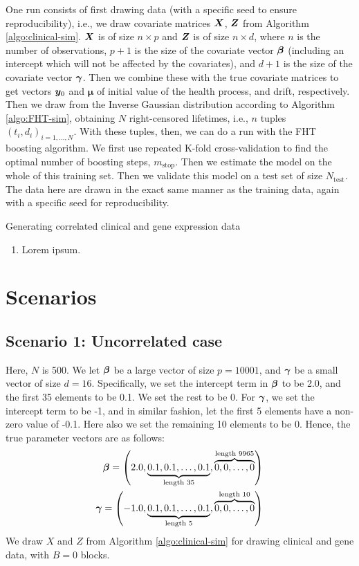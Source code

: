 One run consists of first drawing data (with a specific seed to ensure reproducibility), i.e., we draw covariate matrices $\bm{X}$, $\bm{Z}$ from Algorithm \ref{algo:clinical-sim}.
$\bm{X}$ is of size $n\times p$ and $\bm{Z}$ is of size $n\times d$, where $n$ is the number of observations, $p+1$ is the size of the covariate vector $\boldsymbol{\beta}$ (including an intercept which will not be affected by the covariates), and $d+1$ is the size of the covariate vector $\boldsymbol{\gamma}$.
Then we combine these with the true covariate matrices to get vectors $\bm{y}_0$ and $\mathbf{\mu}$ of initial value of the health process, and drift, respectively.
Then we draw from the Inverse Gaussian distribution according to Algorithm \ref{algo:FHT-sim}, obtaining $N$ right-censored lifetimes, i.e., $n$ tuples $(t_i,d_i)_{i=1,\ldots,N}$.
With these tuples, then, we can do a run with the FHT boosting algorithm. We first use repeated K-fold cross-validation to find the optimal number of boosting steps, $m_{\text{stop}}$.
Then we estimate the model on the whole of this training set.
Then we validate this model on a test set of size $N_{\text{test}}$.
The data here are drawn in the exact same manner as the training data, again with a specific seed for reproducibility.

\begin{algorithm}
\caption{Generating correlated clinical and gene expression data}
\label{algo:clinical-sim}
\begin{enumerate}
    \item Lorem ipsum.
\end{enumerate}
\end{algorithm}

\section{Scenarios}
\subsection{Scenario 1: Uncorrelated case}

Here, $N$ is 500. We let $\boldsymbol{\beta}$ be a large vector of size $p=10001$, and $\boldsymbol{\gamma}$ be a small vector of size $d=16$. Specifically, we set the intercept term in $\boldsymbol{\beta}$ to be 2.0, and the first 35 elements to be 0.1. We set the rest to be 0. For $\boldsymbol{\gamma}$, we set the intercept term to be -1, and in similar fashion, let the first 5 elements have a non-zero value of -0.1. Here also we set the remaining 10 elements to be 0.
Hence, the true parameter vectors are as follows:
\begin{align*}
    \boldsymbol{\beta}=\left(2.0, \underbrace{0.1, 0.1, \ldots, 0.1}_{\text{length 35}}, \overbrace{0, 0, \ldots, 0}^{\text{length 9965}}\right) \\
    \boldsymbol{\gamma}=\left(-1.0, \underbrace{0.1, 0.1, \ldots, 0.1}_{\text{length 5}}, \overbrace{0, 0, \ldots, 0}^{\text{length 10}}\right)
\end{align*}
We draw $X$ and $Z$ from Algorithm \ref{algo:clinical-sim} for drawing clinical and gene data, with $B=0$ blocks.

